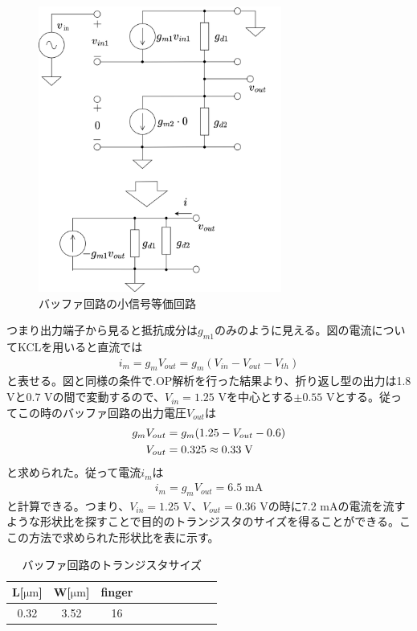 \documentclass[twocolumn]{jsarticle}
\begin{document}
        \begin{figure}[H]
            \begin{center}
                \includegraphics*[width = 80mm]{figures/buf_equal.png}
                \caption{バッファ回路の小信号等価回路}
                \label{fig:buf_eq}
            \end{center}
        \end{figure}
        つまり出力端子から見ると抵抗成分は$g_{m1}$のみのように見える。図の電流についてKCLを用いると直流では
        \begin{align}
            i_{m}=g_{m}V_{out}=g_{m}(V_{in}-V_{out}-V_{th})
        \end{align}
        と表せる。図と同様の条件で.OP解析を行った結果より、折り返し型の出力は1.8 Vと0.7 Vの間で変動するので、$V_{in}=1.25$ Vを中心とする$\pm 0.55$ Vとする。従ってこの時のバッファ回路の出力電圧$V_{out}$は
        \begin{align}
            g_{m}V_{out} &=g_{m}(1.25-V_{out}-0.6)     \notag\\
            V_{out}&=0.325\approx0.33\;\mathrm{V}   \notag
        \end{align}
        と求められた。従って電流$i_{m}$は
        \begin{align*}
            i_{m}=g_{m}V_{out}=6.5\;\mathrm{mA}
        \end{align*}
        と計算できる。つまり、$V_{in}=1.25$ V、$V_{out}=0.36$ Vの時に7.2 mAの電流を流すような形状比を探すことで目的のトランジスタのサイズを得ることができる。ここの方法で求められた形状比を表に示す。
        \begin{table}[H]
            \caption{バッファ回路のトランジスタサイズ}
            \label{table:buf_size}
            \centering
            \begin{tabular}{cccccccccc}
                L[$\mathrm{\mu m}$] & W[$\mathrm{\mu m}$] & finger\\
                \hline \hline
                0.32 & 3.52 & 16 \\  
            \end{tabular}
        \end{table}
\end{document}
